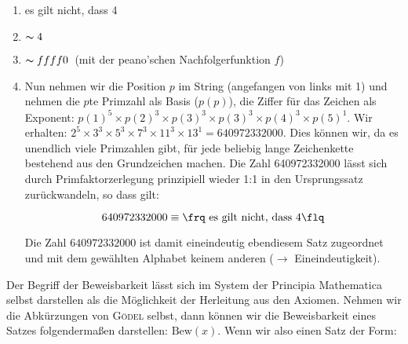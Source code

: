 \begin{enumerate}
	\item \frq es gilt nicht, dass 4\flq
	\item \frq$\thicksim 4$\flq
	\item \frq$\thicksim ffff0$\flq\ (mit der peano'schen Nachfolgerfunktion $f$)
	\item Nun nehmen wir die Position $p$ im String (angefangen von links mit 1)
		und nehmen die $p$te Primzahl als Basis ($p(p)$), die Ziffer für das Zeichen
		als Exponent: $p(1)^5 \times p(2)^3 \times p(3)^3 \times p(3)^3 \times p(4)^3 \times p(5)^1$.
		Wir erhalten:
		$2^5 \times 3^3 \times 5^3 \times 7^3 \times 11^3 \times 13^1 = 640972332000$. Dies
		können wir, da es unendlich viele Primzahlen gibt, für
		jede beliebig lange Zeichenkette
		bestehend aus den Grundzeichen machen. Die Zahl 640972332000 lässt sich durch
		Primfaktorzerlegung prinzipiell wieder 1:1 in den Ursprungssatz zurückwandeln, so dass gilt:

		$$ 640972332000 \equiv \text{\frq es gilt nicht, dass 4\flq} $$

		Die Zahl $640972332000$ ist damit eineindeutig ebendiesem Satz zugeordnet und mit dem
		gewählten Alphabet keinem anderen ($\longrightarrow$ Eineindeutigkeit).
\end{enumerate}

Der Begriff der Beweisbarkeit
lässt sich im System der Principia Mathematica selbst
darstellen als die Möglichkeit der Herleitung aus den Axiomen. Nehmen wir die Abkürzungen
von \textsc{Gödel} selbst, dann können wir die Beweisbarkeit eines Satzes folgendermaßen
darstellen: $\text{Bew}\left(x\right)$.
Wenn wir also einen Satz der Form:


